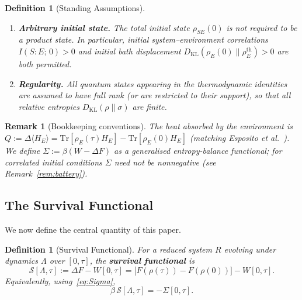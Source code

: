 \documentclass[12pt]{article}
\newtheorem{definition}[theorem]{Definition}
\newtheorem{remark}[theorem]{Remark}
\begin{document}
\begin{definition}[Standing Assumptions]
\begin{enumerate}
\item[\textup{(A4)}]
  \textbf{Arbitrary initial state.}
  The total initial state $\rho_{SE}(0)$ is \emph{not}
  required to be a product state.
  In particular, initial system--environment correlations
  $I(S{:}E;\,0) > 0$ and initial bath displacement
  $D_{\mathrm{KL}}(\rho_E(0)\|\rho_E^{\mathrm{th}}) > 0$
  are both permitted.
\item[\textup{(A5)}]
  \textbf{Regularity.}
  All quantum states appearing in the thermodynamic
  identities are assumed to have full rank (or are
  restricted to their support), so that all relative
  entropies $D_{\mathrm{KL}}(\rho\|\sigma)$ are finite.
\end{enumerate}
\end{definition}

\begin{remark}[Bookkeeping conventions]
\label{rem:bookkeeping}
The heat absorbed by the environment is
$Q := \Delta\langle H_E \rangle
= \mathrm{Tr}[\rho_E(\tau) H_E]
  - \mathrm{Tr}[\rho_E(0) H_E]$
(matching
Esposito \emph{et al.}~\cite{EspositoLindenbergVandenBroeck2010}).
We define $\Sigma := \beta(W - \Delta F)$ as a
\emph{generalised entropy-balance functional};
for correlated initial conditions $\Sigma$ need not be
nonnegative
(see Remark~\ref{rem:battery}).
\end{remark}

\subsection{The Survival Functional}
\label{subsec:survival}

We now define the central quantity of this paper.

\begin{definition}[Survival Functional]
\label{def:survival}
For a reduced system $R$ evolving under dynamics $\Lambda$
over $[0,\tau]$, the \textbf{survival functional} is
\begin{equation}
\label{eq:survival}
\mathcal{S}[\Lambda, \tau]
:= \Delta F - W[0,\tau]
= \bigl[F(\rho(\tau)) - F(\rho(0))\bigr] - W[0,\tau].
\end{equation}
Equivalently, using~\eqref{eq:Sigma},
\begin{equation}
\label{eq:survival_Sigma}
\beta\,\mathcal{S}[\Lambda,\tau] = -\Sigma[0,\tau].
\end{equation}
\end{definition}
\end{document}
